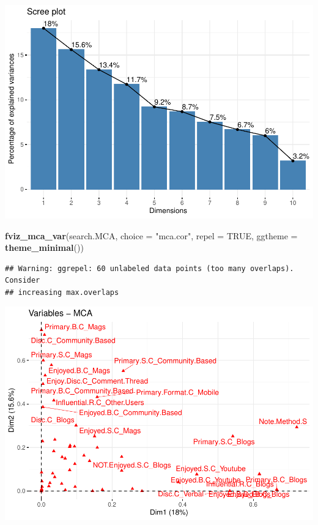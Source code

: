 \documentclass[
]{article}
\newenvironment{Shaded}{\begin{snugshade}}{\end{snugshade}}
\newcommand{\DataTypeTok}[1]{\textcolor[rgb]{0.13,0.29,0.53}{#1}}
\newcommand{\KeywordTok}[1]{\textcolor[rgb]{0.13,0.29,0.53}{\textbf{#1}}}
\newcommand{\NormalTok}[1]{#1}
\newcommand{\OtherTok}[1]{\textcolor[rgb]{0.56,0.35,0.01}{#1}}
\newcommand{\StringTok}[1]{\textcolor[rgb]{0.31,0.60,0.02}{#1}}
\begin{document}
\includegraphics{Average-User-MCA_files/figure-latex/diet no enjoy-1.pdf}

\begin{Shaded}
\begin{Highlighting}[]
\KeywordTok{fviz_mca_var}\NormalTok{(search.MCA, }\DataTypeTok{choice =} \StringTok{"mca.cor"}\NormalTok{, }\DataTypeTok{repel =} \OtherTok{TRUE}\NormalTok{,}
             \DataTypeTok{ggtheme =} \KeywordTok{theme_minimal}\NormalTok{())}
\end{Highlighting}
\end{Shaded}

\begin{verbatim}
## Warning: ggrepel: 60 unlabeled data points (too many overlaps). Consider
## increasing max.overlaps
\end{verbatim}

\includegraphics{Average-User-MCA_files/figure-latex/diet no enjoy-2.pdf}
\end{document}
